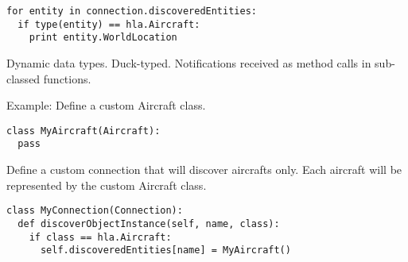 \documentclass[12pt,a4paper]{howto}
\begin{document}
\begin{verbatim}
for entity in connection.discoveredEntities:
  if type(entity) == hla.Aircraft:
    print entity.WorldLocation
\end{verbatim}

Dynamic data types. Duck-typed.
Notifications received as method calls in sub-classed functions.

Example:
Define a custom Aircraft class.

\begin{verbatim}
class MyAircraft(Aircraft):
  pass
\end{verbatim}

Define a custom connection that will discover aircrafts only. Each aircraft will
be represented by the custom Aircraft class.

\begin{verbatim}
class MyConnection(Connection):
  def discoverObjectInstance(self, name, class):
    if class == hla.Aircraft:
      self.discoveredEntities[name] = MyAircraft()
\end{verbatim}


\end{document}
